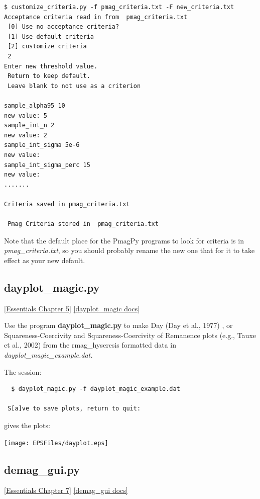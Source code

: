 \documentclass[11pt]{book}
\begin{document}
{{{\begin{verbatim}
$ customize_criteria.py -f pmag_criteria.txt -F new_criteria.txt
Acceptance criteria read in from  pmag_criteria.txt
 [0] Use no acceptance criteria?
 [1] Use default criteria
 [2] customize criteria
 2
Enter new threshold value.
 Return to keep default.
 Leave blank to not use as a criterion

sample_alpha95 10
new value: 5
sample_int_n 2
new value: 2
sample_int_sigma 5e-6
new value:
sample_int_sigma_perc 15
new value:
.......

Criteria saved in pmag_criteria.txt

 Pmag Criteria stored in  pmag_criteria.txt

\end{verbatim}

Note that the default place for the PmagPy programs to look for criteria is in {\it pmag\_criteria.txt}, so you should probably rename the new one that for it to take effect as your new default.

%

\subsection{dayplot\_magic.py}
\href{http://earthref.org/MAGIC/books/Tauxe/Essentials/WebBook3ch5.html#ch5}{[Essentials Chapter 5]}
\href{https://github.com/PmagPy/PmagPy/blob/master/programs/dayplot_magic.py}{[dayplot\_magic docs]}

 Use the program {\bf dayplot\_magic.py}  to make Day (Day et al., 1977) \nocite{day77}, or Squareness-Coercivity and Squareness-Coercivity of Remanence plots (e.g., Tauxe et al., 2002) \nocite{tauxe02} from the rmag\_hyseresis formatted data in {\it dayplot\_magic\_example.dat.}

 The session:

  \begin{verbatim}
  $ dayplot_magic.py -f dayplot_magic_example.dat

 S[a]ve to save plots, return to quit:
\end{verbatim}



\noindent gives the plots:

{%
  \texttt{[image: EPSFiles/dayplot.eps]}}



\subsection{demag\_gui.py}
\href{http://earthref.org/MAGIC/books/Tauxe/Essentials/WebBook3ch7.html}{[Essentials Chapter 7]}
\href{https://github.com/PmagPy/PmagPy/blob/master/demag_gui.py}{[demag\_gui docs]}

}}}
\end{document}
